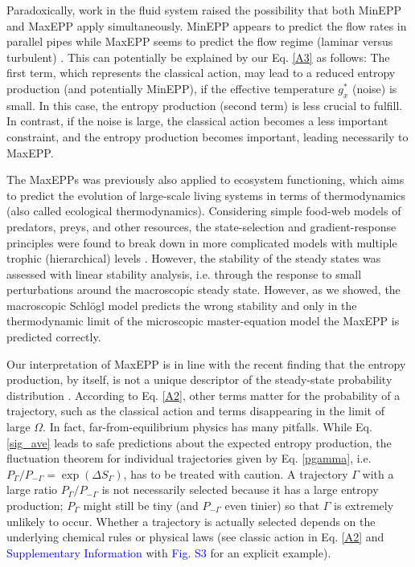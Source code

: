 \documentclass[aps,prl,reprint,singlecolumn,superscriptaddress]{revtex4}
\begin{document}
{Paradoxically, work in the fluid system raised the possibility that both MinEPP and MaxEPP apply simultaneously. 
MinEPP appears to predict the flow rates in parallel pipes while MaxEPP seems to predict the flow regime (laminar versus turbulent) \cite{niven10}. 
This can potentially be explained by our Eq. \ref{A3} as follows:
The first term, which represents the classical action, may lead to a reduced entropy production (and potentially MinEPP), if the 
effective temperature $g_x^*$ (noise) is small. In this case, the entropy production (second term) is less crucial to fulfill. 
In contrast, if the noise is large, the classical action becomes a less important constraint, and the entropy production becomes 
important, leading necessarily to MaxEPP.

The MaxEPPs was previously also applied to ecosystem functioning, which aims to predict the evolution of 
large-scale living systems in terms of thermodynamics (also called ecological thermodynamics). Considering simple food-web 
models of predators, preys, and other resources, the state-selection and gradient-response principles were found to break down in more 
complicated models with multiple trophic (hierarchical) levels \cite{meysman10}. However, the stability of the steady states was 
assessed with linear stability analysis, i.e. through the response to small perturbations around the macroscopic steady state.
However, as we showed, the macroscopic Schl\"ogl model predicts the wrong stability and only in the thermodynamic limit of the
microscopic master-equation model the MaxEPP is predicted correctly.

Our interpretation of MaxEPP is in line with the recent finding that the entropy production, by itself, 
is not a unique descriptor of the steady-state probability distribution \cite{zia06}. According to Eq. 
\ref{A2}, other terms matter for the probability of a trajectory, such as the classical action and terms disappearing in the limit 
of large $\Omega$. In fact, far-from-equilibrium physics has many pitfalls. While Eq. \ref{sig_ave} leads to safe predictions 
about the expected entropy production, the fluctuation theorem for individual trajectories given by Eq. \ref{pgamma}, 
i.e. $P_\Gamma/P_{-\Gamma}=\exp(\Delta S_\Gamma)$, has to be treated with caution. A trajectory $\Gamma$ with a large ratio 
$P_\Gamma/P_{-\Gamma}$ is not necessarily selected because it has a large entropy production; $P_\Gamma$ might still be tiny 
(and $P_{-\Gamma}$ even tinier) so that $\Gamma$ is extremely unlikely to occur. Whether a trajectory is actually selected depends on 
the underlying chemical rules or physical laws (see classic action in Eq. \ref{A2} and \textcolor{blue}{Supplementary Information} 
with \textcolor{blue}{Fig. S3} for an explicit example).

}
\end{document}
